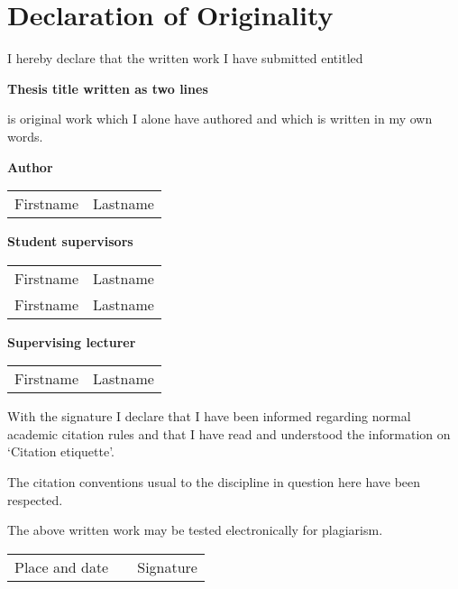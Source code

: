 
\section*{Declaration of Originality}

\vspace{1cm}

I hereby declare that the written work I have submitted entitled

\vspace{0.5cm}

\textbf{Thesis title written as two lines}

\vspace{0.5cm}

is original work which I alone have authored and which is written in my own words.

\vspace{1cm}

\textbf{Author}

\vspace{0.5cm}

\begin{tabular}{ p{5cm} p{5cm} }
  Firstname & Lastname \\
\end{tabular}

\vspace{0.5cm}

\textbf{Student supervisors}

\vspace{0.5cm}

\begin{tabular}{ p{5cm} p{5cm} }
  Firstname & Lastname \\
  Firstname & Lastname \\
\end{tabular}

\vspace{0.5cm}

\textbf{Supervising lecturer}

\vspace{0.5cm}

\begin{tabular}{ p{5cm} p{5cm} }
  Firstname & Lastname \\
\end{tabular}

\vspace{1cm}
With the signature I declare that I have been informed regarding normal academic citation rules and that I have read and understood the information on `Citation etiquette'.

The citation conventions usual to the discipline in question here have been respected.

\vspace{0.5cm}

The above written work may be tested electronically for plagiarism.

\vspace{4cm}

\begin{tabular}{ p{4.5cm} p{1cm} p{4.5cm} }
  \cline{1-1} \cline{3-3}
  Place and date & & Signature \\
\end{tabular}
